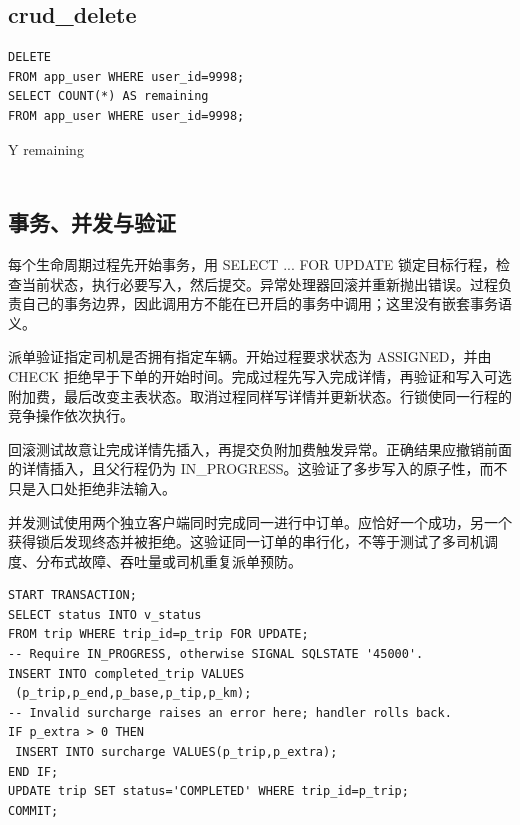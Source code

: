 \documentclass[11pt,a4paper]{article}
\renewcommand{\arraystretch}{1.3}
\begin{document}
\par\noindent\begin{minipage}{\linewidth}\setlength{\parskip}{0pt}\renewcommand{\arraystretch}{1.08}\titlespacing*{\subsection}{0pt}{7pt}{4pt}\lstset{aboveskip=4pt,belowskip=4pt}
\subsection*{crud\_\allowbreak{}delete}
\begin{lstlisting}
DELETE
FROM app_user WHERE user_id=9998;
SELECT COUNT(*) AS remaining
FROM app_user WHERE user_id=9998;
\end{lstlisting}
\par\begingroup\small\noindent
\begin{tabularx}{\linewidth}{Y}
\toprule
remaining\\\\
\bottomrule
\end{tabularx}
\par\endgroup
\end{minipage}\par\vspace{5pt}

\subsection{事务、并发与验证}
每个生命周期过程先开始事务，用 SELECT ... FOR UPDATE 锁定目标行程，检查当前状态，执行必要写入，然后提交。异常处理器回滚并重新抛出错误。过程负责自己的事务边界，因此调用方不能在已开启的事务中调用；这里没有嵌套事务语义。

派单验证指定司机是否拥有指定车辆。开始过程要求状态为 ASSIGNED，并由 CHECK 拒绝早于下单的开始时间。完成过程先写入完成详情，再验证和写入可选附加费，最后改变主表状态。取消过程同样写详情并更新状态。行锁使同一行程的竞争操作依次执行。

回滚测试故意让完成详情先插入，再提交负附加费触发异常。正确结果应撤销前面的详情插入，且父行程仍为 IN\_\allowbreak{}PROGRESS。这验证了多步写入的原子性，而不只是入口处拒绝非法输入。

并发测试使用两个独立客户端同时完成同一进行中订单。应恰好一个成功，另一个获得锁后发现终态并被拒绝。这验证同一订单的串行化，不等于测试了多司机调度、分布式故障、吞吐量或司机重复派单预防。

\begin{lstlisting}
START TRANSACTION;
SELECT status INTO v_status
FROM trip WHERE trip_id=p_trip FOR UPDATE;
-- Require IN_PROGRESS, otherwise SIGNAL SQLSTATE '45000'.
INSERT INTO completed_trip VALUES
 (p_trip,p_end,p_base,p_tip,p_km);
-- Invalid surcharge raises an error here; handler rolls back.
IF p_extra > 0 THEN
 INSERT INTO surcharge VALUES(p_trip,p_extra);
END IF;
UPDATE trip SET status='COMPLETED' WHERE trip_id=p_trip;
COMMIT;
\end{lstlisting}
\end{document}
